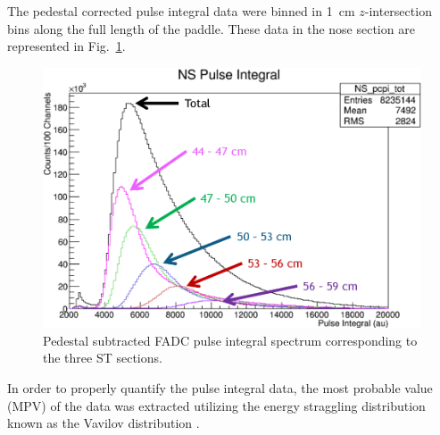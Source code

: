 {The pedestal corrected pulse integral data were binned in 1~cm $z$-intersection bins along the full length of the paddle. These data in the nose section are represented in Fig.~\ref{fig:pisecnose}.
	\begin{figure}
		\centering
		\includegraphics[width=1.0\columnwidth]{calibration/figs/pi_sec_nose}
		\caption{Pedestal subtracted FADC pulse integral spectrum corresponding to the three ST sections.}
		\label{fig:pisecnose}
	\end{figure}
In order to properly quantify the pulse integral data, the most probable value (MPV) of the data was extracted utilizing the energy straggling distribution known as the Vavilov distribution \cite{vavilov_1957}.  

}
